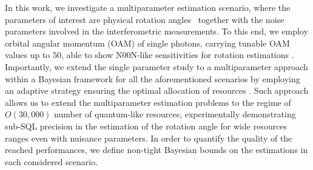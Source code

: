 \documentclass[aps,pra,twocolumn,notitlepage,superscriptaddress]{revtex4-1}
\begin{document}
In this work, we investigate a multiparameter estimation scenario, where the parameters of interest are physical rotation angles~\cite{goldberg2018quantum,goldberg2021rotation} together with the noise parameters involved in the interferometric measurements. 
To this end, we employ orbital angular momentum (OAM) of single photons, carrying tunable OAM values up to $50$, able to show N00N-like sensitivities for rotation estimations \cite{dambrosio_gear2013,cimini2021non,Fickler13642,barnett2006resolution,jha2011supersensitive,PhysRevLett.127.263601}. Importantly, we extend the single parameter study \cite{cimini2021non} to a multiparameter approach within a Bayesian framework \cite{helstrom1976quantum,box2011bayesian,d2022experimental,rubio2020bayesian} for all the aforementioned scenarios by employing an adaptive strategy ensuring the optimal allocation of resources \cite{granade2012robust}. Such approach allows us to extend the multiparameter estimation problems to the regime of $O(30,000)$ number of quantum-like resources, experimentally demonstrating sub-SQL precision in the estimation of the rotation angle for wide resources ranges even with nuisance parameters. In order to quantify the quality of the reached performances, we define non-tight Bayesian bounds on the estimations in each considered scenario.
\end{document}
